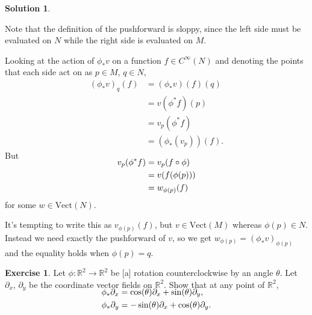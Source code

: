 \documentclass[11pt, a4paper]{article}
\theoremstyle{definition}
\newtheorem{ex}{Exercise}[part]
\newtheorem{sol}{Solution}[part]
\begin{document}
\begin{sol}\label{sol:pushforwardvectorfield}

Note that the definition of the pushforward is sloppy, since the left side must be evaluated on $N$ while the right side is evaluated on $M$.

Looking at the action of $\phi_* v$ on a function $f \in C^\infty (N)$ and denoting the points that each side act on as $p \in M$, $q \in N$,
\begin{align*}
    {(\phi_* v)}_q (f) &= (\phi_* v) (f) (q) \\
                       &= v(\phi^* f)(p) \\
                       &= v_p(\phi^* f) \\
                       &= (\phi_* (v_p))(f).
\end{align*}
But
\begin{align*}
    \SwapAboveDisplaySkip
    v_p (\phi^* f) &= v_p (f \circ \phi) \\
                   &= v(f(\phi(p))) \\
                   &= w_{\phi(p)}(f)
\end{align*}
for some $w \in \text{Vect}(N)$.

It's tempting to write this as $v_{\phi(p)}(f)$, but $v \in \text{Vect}(M)$ whereas $\phi(p) \in N$.
Instead we need exactly the pushforward of $v$, so we get $w_{\phi(p)} = {(\phi_* v)}_{\phi(p)}$ and the equality holds when $\phi(p) = q$.

\end{sol}

\begin{ex}

Let $\phi: \mathbb{R}^2 \to \mathbb{R}^2$ be [a] rotation counterclockwise by an angle $\theta$. Let $\partial_x$, $\partial_y$ be the coordinate vector fields on $\mathbb{R}^2$. Show that at any point of $\mathbb{R}^2$,
\begin{align*}
    \SwapAboveDisplaySkip
    \phi_* \partial_x &= \cos(\theta) \partial_x + \sin(\theta) \partial_y, \\
    \phi_* \partial_y &= -\sin(\theta) \partial_x + \cos(\theta) \partial_y.
\end{align*}

\end{ex}
\end{document}
